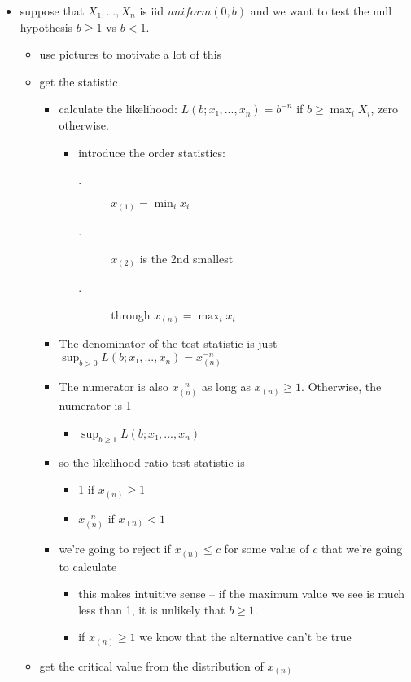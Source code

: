 \begin{itemize}
\item suppose that $X₁,...,X_n$ is iid $uniform(0,b)$ and we want
      to test the null hypothesis $b ≥ 1$ vs $b < 1$.
\begin{itemize}
\item use pictures to motivate a lot of this
\item get the statistic
\begin{itemize}
\item calculate the likelihood: $L(b; x₁,...,x_n) = b^{-n}$ if
  $b ≥ \max_i X_i$, zero otherwise.
\begin{itemize}
\item introduce the order statistics:
\begin{description}
\item[.] $x_{(1)} = \min_i x_i$
\item[.] $x_{(2)}$ is the 2nd smallest
\item[.] through $x_{(n)} = \max_i x_i$
\end{description}
\end{itemize}
\item The denominator of the test statistic is just
  $\sup_{b > 0} L(b; x₁,...,x_n) = x_{(n)}^{-n}$
\item The numerator is also $x_{(n)}^{-n}$ as long as $x_{(n)} ≥ 1$.
  Otherwise, the numerator is 1
\begin{itemize}
\item $\sup_{b ≥ 1} L(b; x₁,...,x_n)$
\end{itemize}
\item so the likelihood ratio test statistic is
\begin{itemize}
\item 1 if $x_{(n)} ≥ 1$
\item $x_{(n)}^{-n}$ if $x_{(n)} < 1$
\end{itemize}
\item we're going to reject if $x_{(n)} ≤ c$ for some value of
          $c$ that we're going to calculate
\begin{itemize}
\item this makes intuitive sense -- if the maximum value we
            see is much less than 1, it is unlikely that $b ≥
            1$.
\item if $x_{(n)} ≥ 1$ we know that the alternative can't be true
\end{itemize}
\end{itemize}
\item get the critical value from the distribution of $x_{(n)}$

\end{itemize}
\end{itemize}
